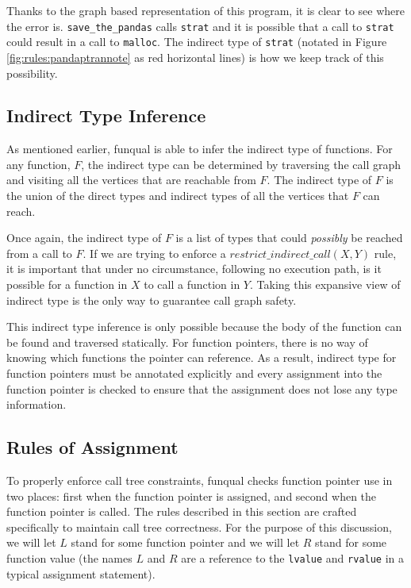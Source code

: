 Thanks to the graph based representation of this program, it is clear to see where the error is.  \lstinline{save_the_pandas} calls \lstinline{strat} and it is possible that a call to \lstinline{strat} could result in a call to \lstinline{malloc}.  The indirect type of \lstinline{strat} (notated in Figure \ref{fig:rules:pandaptrannote} as red horizontal lines) is how we keep track of this possibility.  

\subsection{Indirect Type Inference}

As mentioned earlier, funqual is able to infer the indirect type of functions.  For any function, $F$, the indirect type can be determined by traversing the call graph and visiting all the vertices that are reachable from $F$.  The indirect type of $F$ is the union of the direct types and indirect types of all the vertices that $F$ can reach.  

Once again, the indirect type of $F$ is a list of types that could \textit{possibly} be reached from a call to $F$.  If we are trying to enforce a $restrict\_indirect\_call(X, Y)$ rule, it is important that under no circumstance, following no execution path, is it possible for a function in $X$ to call a function in $Y$.  Taking this expansive view of indirect type is the only way to guarantee call graph safety.  

This indirect type inference is only possible because the body of the function can be found and traversed statically.  For function pointers, there is no way of knowing which functions the pointer can reference.  As a result, indirect type for function pointers must be annotated explicitly and every assignment into the function pointer is checked to ensure that the assignment does not lose any type information.

\subsection{Rules of Assignment}

To properly enforce call tree constraints, funqual checks function pointer use in two places:  first when the function pointer is assigned, and second when the function pointer is called.  The rules described in this section are crafted specifically to maintain call tree correctness.  For the purpose of this discussion, we will let $L$ stand for some function pointer and we will let $R$ stand for some function value (the names $L$ and $R$ are a reference to the \lstinline{lvalue} and \lstinline{rvalue} in a typical assignment statement).  

